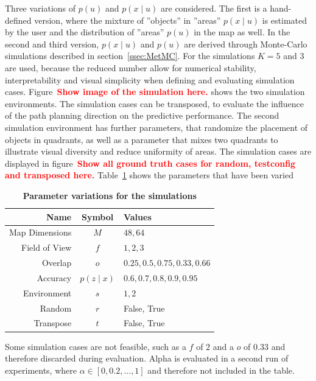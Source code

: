 \documentclass[twocolumn,letterpaper]{IEEEAerospaceCLS}  %
\newcommand\todo[1]{\textbf{\textcolor{red}{#1}}}
\begin{document}
Three variations of $p(u)$ and $p(x\mid u)$ are considered. The first is a hand-defined version, where the mixture of ''objects'' in ''areas'' $p(x\mid u)$ is estimated by the user and the distribution of ''areas'' $p(u)$ in the map as well. In the second and third version, $p(x\mid u)$ and $p(u)$ are derived through Monte-Carlo simulations described in section~\ref{ssec:MetMC}. For the simulations $K=5$ and $3$ are used, because the reduced number allow for numerical stability, interpretability and visual simplicity when defining and evaluating simulation cases. Figure~\todo{Show image of the simulation here.} shows the two simulation environments.
The simulation cases can be transposed, to evaluate the influence of the path planning direction on the predictive performance. The second simulation environment has further parameters, that randomize the placement of objects in quadrants, as well as a parameter that mixes two quadrants to illustrate visual diversity and reduce uniformity of areas. The simulation cases are displayed in figure~\todo{Show all ground truth cases for random, testconfig and transposed here.} Table~\ref{tab:params} shows the parameters that have been varied 
\begin{table}[]
    \renewcommand{\arraystretch}{1.3}
    \caption{\bf Parameter variations for the simulations}
    \label{tab:params}
    \centering
    \begin{tabular}{|r||c|l|}
        \hline
        \bfseries Name      & \bfseries Symbol & \bfseries Values       \\
        \hline \hline
        Map Dimensions & $M$ & $48, 64$\\
        \hline
        Field of View  & $f$              & $1, 2, 3$ \\
        \hline
        Overlap     & $o$              & $0.25, 0.5, 0.75, 0.33, 0.66$         \\
        \hline
        Accuracy & $p(z\mid x)$              & $0.6, 0.7, 0.8, 0.9, 0.95$        \\
        \hline
        Environment & $s$& $1, 2$ \\
        \hline
        Random & $r$ & False, True \\
        \hline
        Transpose & $t$ & False, True \\
        \hline
    \end{tabular}
\end{table}
Some simulation cases are not feasible, such as a $f$ of $2$ and a $o$ of $0.33$ and therefore discarded during evaluation. Alpha is evaluated in a second run of experiments, where $\alpha \in [0, 0.2, ..., 1]$ and therefore not included in the table.
\end{document}
